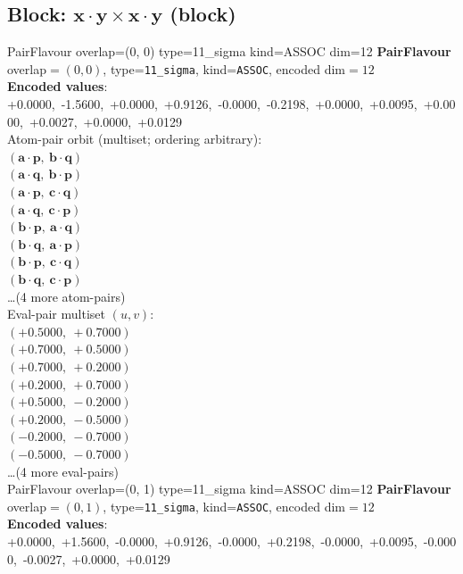 \documentclass[a4paper,11pt]{article}
\newcommand{\pdcegfomjfhook}[2]{\mathbf{#1} \cdot \mathbf{#2}}
\begin{document}
\subsection{Block: $\pdcegfomjfhook{x}{y} \times \pdcegfomjfhook{x}{y}$  (block)}
    PairFlavour  overlap=(0, 0)  type=11\_sigma  kind=ASSOC  dim=12
\textbf{PairFlavour} overlap$=(0, 0)$, type=\texttt{11\_sigma}, kind=\texttt{ASSOC}, encoded dim$=12$\\
\textbf{      Encoded values}: +0.0000,\ -1.5600,\ +0.0000,\ +0.9126,\ -0.0000,\ -0.2198,\ +0.0000,\ +0.0095,\ +0.0000,\ +0.0027,\ +0.0000,\ +0.0129\\
\quad Atom-pair orbit (multiset; ordering arbitrary):\\
$(\pdcegfomjfhook{a}{p},\ \pdcegfomjfhook{b}{q})$\\
$(\pdcegfomjfhook{a}{q},\ \pdcegfomjfhook{b}{p})$\\
$(\pdcegfomjfhook{a}{p},\ \pdcegfomjfhook{c}{q})$\\
$(\pdcegfomjfhook{a}{q},\ \pdcegfomjfhook{c}{p})$\\
$(\pdcegfomjfhook{b}{p},\ \pdcegfomjfhook{a}{q})$\\
$(\pdcegfomjfhook{b}{q},\ \pdcegfomjfhook{a}{p})$\\
$(\pdcegfomjfhook{b}{p},\ \pdcegfomjfhook{c}{q})$\\
$(\pdcegfomjfhook{b}{q},\ \pdcegfomjfhook{c}{p})$\\
\quad \ldots (4 more atom-pairs)\\
\quad Eval-pair multiset $(u, v)$:\\
$(+0.5000,\ +0.7000)$\\
$(+0.7000,\ +0.5000)$\\
$(+0.7000,\ +0.2000)$\\
$(+0.2000,\ +0.7000)$\\
$(+0.5000,\ -0.2000)$\\
$(+0.2000,\ -0.5000)$\\
$(-0.2000,\ -0.7000)$\\
$(-0.5000,\ -0.7000)$\\
\quad \ldots (4 more eval-pairs)\\
    PairFlavour  overlap=(0, 1)  type=11\_sigma  kind=ASSOC  dim=12
\textbf{PairFlavour} overlap$=(0, 1)$, type=\texttt{11\_sigma}, kind=\texttt{ASSOC}, encoded dim$=12$\\
\textbf{      Encoded values}: +0.0000,\ +1.5600,\ -0.0000,\ +0.9126,\ -0.0000,\ +0.2198,\ -0.0000,\ +0.0095,\ -0.0000,\ -0.0027,\ +0.0000,\ +0.0129\\
\end{document}
